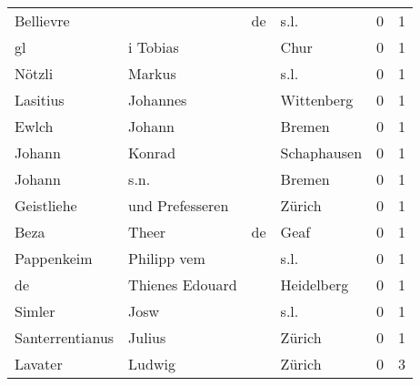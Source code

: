 \begin{center}
\begin{tiny}
\begin{longtabu}{llllrr}
                Bellievre &                                    &          de &                                        s.l. &          0 &         1 \\
                       gl &                           i Tobias &             &                                        Chur &          0 &         1 \\
                   Nötzli &                             Markus &             &                                        s.l. &          0 &         1 \\
                 Lasitius &                           Johannes &             &                                  Wittenberg &          0 &         1 \\
                    Ewlch &                             Johann &             &                                      Bremen &          0 &         1 \\
                   Johann &                             Konrad &             &                                 Schaphausen &          0 &         1 \\
                   Johann &                               s.n. &             &                                      Bremen &          0 &         1 \\
               Geistliehe &                    und Prefesseren &             &                                      Zürich &          0 &         1 \\
                     Beza &                              Theer &          de &                                        Geaf &          0 &         1 \\
               Pappenkeim &                        Philipp vem &             &                                        s.l. &          0 &         1 \\
                       de &                    Thienes Edouard &             &                                  Heidelberg &          0 &         1 \\
                   Simler &                               Josw &             &                                        s.l. &          0 &         1 \\
          Santerrentianus &                             Julius &             &                                      Zürich &          0 &         1 \\
                  Lavater &                             Ludwig &             &                                      Zürich &          0 &         3 \\

\end{longtabu}
\end{tiny}
\end{center}

